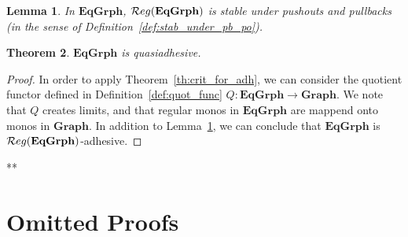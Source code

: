 \documentclass[a4paper, twoside,openright]{report}
\theoremstyle{plain}
\newtheorem{theorem}{Theorem}[section]
\newtheorem{lemma}[theorem]{Lemma}
\theoremstyle{definition}
\begin{document}
\begin{lemma}\label{lemma:eqgrph_stab_po_pb}
    In $\mathbf{EqGrph}$,  $\mathcal{R}eg(\mathbf{EqGrph})$ is stable under pushouts and pullbacks (in the sense of Definition~\ref{def:stab_under_pb_po}).
\end{lemma}

\begin{theorem}
    $\mathbf{EqGrph}$ is quasiadhesive.
\end{theorem}

\begin{proof}
    In order to apply Theorem~\ref{th:crit_for_adh}, we can consider the quotient functor defined in Definition~\ref{def:quot_func} $Q: \mathbf{EqGrph \rightarrow Graph}$. We note that $Q$ creates limits, and that regular monos in $\mathbf{EqGrph}$ are mappend onto monos in $\mathbf{Graph}$. In addition to Lemma~\ref{lemma:eqgrph_stab_po_pb}, we can conclude that $\mathbf{EqGrph}$ is $\mathcal{R}eg(\mathbf{EqGrph})$-adhesive.
\end{proof}

**\appendix


\chapter{Omitted Proofs}
\end{document}
